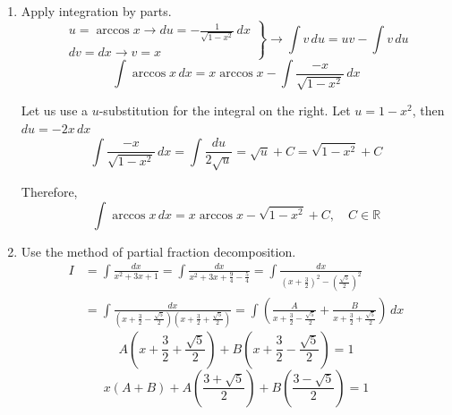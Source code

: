 \documentclass[a4paper, 12pt]{article}
\begin{document}
\begin{enumerate}[leftmargin=*,label=\textbf{\arabic*.}]
\begin{enumerate}[leftmargin=*,label=\textbf{\alph*.}]
Calculate the integral on the left in \eqref{eq:15_16_fall_final_2}.
\[\int\left(x^3+4x^2+2x+8\right)\,dx=\frac{x^4}4+\frac{4x^3}3+x^2+8x+C_1\]

Calculate the integral on the right in \eqref{eq:15_16_fall_final_2}. Decompose the expression into partial fractions.
\[\int\frac{32x-16}{(x-2)(x-1)}\,dx=\int\left(\frac{A}{x-2}+\frac{B}{x-1}\right)\,dx\]
\[32x-16=A(x-1)+B(x-2)=x(A+B)-A-2B\]

Equate the coefficients of like terms.
\[\left.\begin{array}{c}
A+B=32\\
-A-2B=-16 
\end{array}\right\}\rightarrow A=48,\quad B=-16\]

Substitute the values into $A$ and $B$.
\[\int\left(\frac{A}{x-2}+\frac{B}{x-1}\right)\,dx=\int\left(\frac{48}{x-2}-\frac{16}{x-1}\right)\,dx=48\ln|x-2|-16\ln|x-1|+C_2\]

Rewrite \eqref{eq:15_16_fall_final_2}.
\[\boxed{I=\frac{x^4}4+\frac{4x^3}3+x^2+8x+48\ln|x-2|-16\ln|x-1|+C,\quad C\in\mathbb{R}}\]

\item Apply integration by parts.
\[\left.\begin{array}{c}
\displaystyle u=\arccos x\rightarrow du=-\frac1{\sqrt{1-x^2}}\,dx\\
\displaystyle dv=dx\rightarrow v=x
\end{array}\right\}\rightarrow\int v\,du=uv-\int v\,du\]
\[\int\arccos x\,dx=x\arccos x-\int\frac{-x}{\sqrt{1-x^2}}\,dx\]

Let us use a $u$-substitution for the integral on the right. Let $u=1-x^2$, then $du=-2x\,dx$
\[\int\frac{-x}{\sqrt{1-x^2}}\,dx=\int\frac{du}{2\sqrt u}=\sqrt u+C=\sqrt{1-x^2}+C\]

Therefore,
\[\int\arccos x\,dx=\boxed{x\arccos x-\sqrt{1-x^2}+C,\quad C\in\mathbb{R}}\]

\item Use the method of partial fraction decomposition.
\begin{align*}I&=\int\frac{dx}{x^2+3x+1}=\int\frac{dx}{x^2+3x+\frac94-\frac54}=\int\frac{dx}{\left(x+\frac32\right)^2-\left(\frac{\sqrt5}2\right)^2}\\[1em]&=\int\frac{dx}{\left(x+\frac32-\frac{\sqrt5}2\right)\left(x+\frac32+\frac{\sqrt5}2\right)}=\int\left(\frac A{x+\frac32-\frac{\sqrt5}2}+\frac B{x+\frac32+\frac{\sqrt5}2}\right)\,dx\end{align*}
\[A\left(x+\frac32+\frac{\sqrt5}2\right)+B\left(x+\frac32-\frac{\sqrt5}2\right)=1\]
\[x(A+B)+A\left(\frac{3+\sqrt5}2\right)+B\left(\frac{3-\sqrt5}2\right)=1\]


\end{enumerate}
\end{enumerate}
\end{document}
